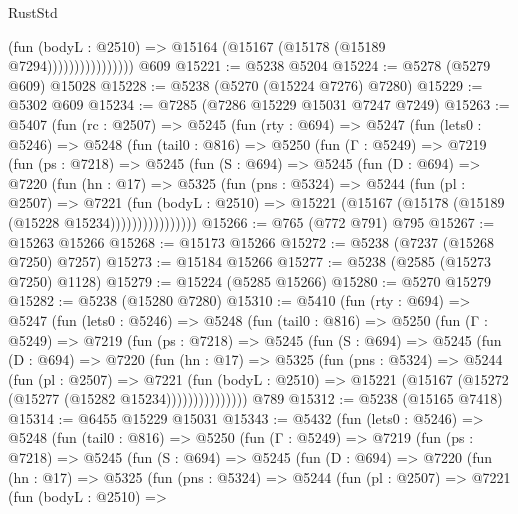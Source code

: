 \begin{lexlean}{RustStd}
\begin{coremodule}
                            (fun (bodyL : @2510) =>
                            @15164 (@15167 (@15178 (@15189 @7294))))))))))))))))
    @609
@15221 := @5238 @5204
@15224 := @5278 (@5279 @609) @15028
@15228 := @5238 (@5270 (@15224 @7276) @7280)
@15229 := @5302 @609
@15234 := @7285 (@7286 @15229 @15031 @7247 @7249)
@15263 := @5407
    (fun (rc : @2507) =>
    @5245
      (fun (rty : @694) =>
      @5247
        (fun (lets0 : @5246) =>
        @5248
          (fun (tail0 : @816) =>
          @5250
            (fun (Γ : @5249) =>
            @7219
              (fun (ps : @7218) =>
              @5245
                (fun (S : @694) =>
                @5245
                  (fun (D : @694) =>
                  @7220
                    (fun (hn : @17) =>
                    @5325
                      (fun (pns : @5324) =>
                      @5244
                        (fun (pl : @2507) =>
                        @7221
                          (fun (bodyL : @2510) =>
                          @15221 (@15167 (@15178 (@15189 (@15228 @15234))))))))))))))))
@15266 := @765 (@772 @791) @795
@15267 := @15263 @15266
@15268 := @15173 @15266
@15272 := @5238 (@7237 (@15268 @7250) @7257)
@15273 := @15184 @15266
@15277 := @5238 (@2585 (@15273 @7250) @1128)
@15279 := @15224 (@5285 @15266)
@15280 := @5270 @15279
@15282 := @5238 (@15280 @7280)
@15310 := @5410
    (fun (rty : @694) =>
    @5247
      (fun (lets0 : @5246) =>
      @5248
        (fun (tail0 : @816) =>
        @5250
          (fun (Γ : @5249) =>
          @7219
            (fun (ps : @7218) =>
            @5245
              (fun (S : @694) =>
              @5245
                (fun (D : @694) =>
                @7220
                  (fun (hn : @17) =>
                  @5325
                    (fun (pns : @5324) =>
                    @5244
                      (fun (pl : @2507) =>
                      @7221
                        (fun (bodyL : @2510) =>
                        @15221 (@15167 (@15272 (@15277 (@15282 @15234)))))))))))))))
    @789
@15312 := @5238 (@15165 @7418)
@15314 := @6455 @15229 @15031
@15343 := @5432
    (fun (lets0 : @5246) =>
    @5248
      (fun (tail0 : @816) =>
      @5250
        (fun (Γ : @5249) =>
        @7219
          (fun (ps : @7218) =>
          @5245
            (fun (S : @694) =>
            @5245
              (fun (D : @694) =>
              @7220
                (fun (hn : @17) =>
                @5325
                  (fun (pns : @5324) =>
                  @5244
                    (fun (pl : @2507) =>
                    @7221
                      (fun (bodyL : @2510) =>

\end{coremodule}
\end{lexlean}
